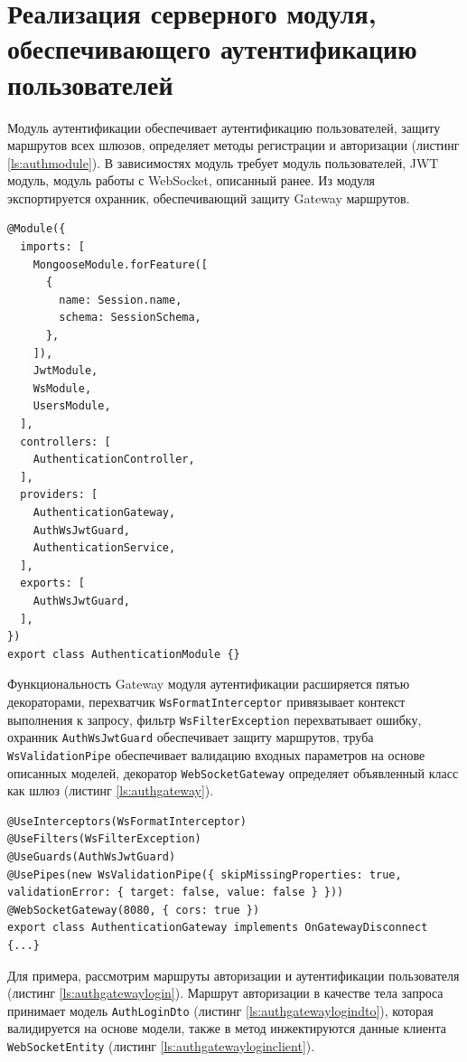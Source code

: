 \section{Реализация серверного модуля, обеспечивающего аутентификацию пользователей}

Модуль аутентификации обеспечивает аутентификацию пользователей, защиту маршрутов всех шлюзов, определяет методы регистрации и авторизации (листинг \ref{ls:authmodule}). В зависимостях модуль требует модуль пользователей, JWT модуль, модуль работы с WebSocket, описанный ранее. Из модуля экспортируется охранник, обеспечивающий защиту Gateway маршрутов.

\begin{lstlisting}[caption={Модуль аутентификации}, label={ls:authmodule}]
@Module({
  imports: [
    MongooseModule.forFeature([
      {
        name: Session.name,
        schema: SessionSchema,
      },
    ]),
    JwtModule,
    WsModule,
    UsersModule,
  ],
  controllers: [
    AuthenticationController,
  ],
  providers: [
    AuthenticationGateway,
    AuthWsJwtGuard,
    AuthenticationService,
  ],
  exports: [
    AuthWsJwtGuard,
  ],
})
export class AuthenticationModule {}
\end{lstlisting}

Функциональность Gateway модуля аутентификации расширяется пятью декораторами, перехватчик \verb|WsFormatInterceptor| привязывает контекст выполнения к запросу, фильтр \verb|WsFilterException| перехватывает ошибку, охранник \verb|AuthWsJwtGuard| обеспечивает защиту маршрутов, труба \verb|WsValidationPipe| обеспечивает валидацию входных параметров на основе описанных моделей, декоратор \verb|WebSocketGateway| определяет объявленный класс как шлюз (листинг \ref{ls:authgateway}).

\begin{lstlisting}[caption={Определение шлюза модуля аутентификации}, label={ls:authgateway}]
@UseInterceptors(WsFormatInterceptor)
@UseFilters(WsFilterException)
@UseGuards(AuthWsJwtGuard)
@UsePipes(new WsValidationPipe({ skipMissingProperties: true, validationError: { target: false, value: false } }))
@WebSocketGateway(8080, { cors: true })
export class AuthenticationGateway implements OnGatewayDisconnect {...}
\end{lstlisting}

Для примера, рассмотрим маршруты авторизации и аутентификации пользователя (листинг \ref{ls:authgatewaylogin}). Маршрут авторизации в качестве тела запроса принимает модель \verb|AuthLoginDto| (листинг \ref{ls:authgatewaylogindto}), которая валидируется на основе модели, также в метод инжектируются данные клиента \verb|WebSocketEntity| (листинг \ref{ls:authgatewayloginclient}).

